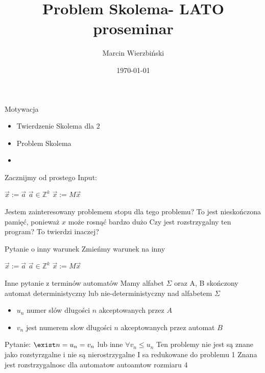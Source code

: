 \documentclass{beamer}
\title{Problem Skolema- LATO proseminar}
\author{Marcin Wierzbiński}
\institute{MIMUW}
\date{\today}
\def\Z{\mathbb Z}
\theoremstyle{definition}
\begin{document}
\frame{\titlepage}

\begin{frame}{Motywacja}
\begin{itemize}
    \item Twierdzenie Skolema dla  $2$
    \item Problem Skolema
    \item 
\end{itemize}
\end{frame}

\begin{frame}{Zacznijmy od prostego}
    Input: 

    \begin{algorithmic}[l]
    \State $\vec{x} := \vec{a}$
    \State $\vec{a} \in \Z^{k}$
      \State $\vec{x} := M \vec{x}$
      
    \EndWhile
    \end{algorithmic}

    Jestem zainteresowany problemem stopu dla tego problemu? To jest nieskończona pamięć, ponieważ $x$ może rosnąć bardzo dużo
    Czy jest rozstrzygalny ten program? To twierdzi inaczej?


\end{frame}

\begin{frame}{Pytanie o inny warunek}
    Zmieńmy warunek na inny 
    \begin{algorithmic}[l]
    \State $\vec{x} := \vec{a}$
    \State $\vec{a} \in \Z^{k}$
      \State $\vec{x} := M \vec{x}$
      
    \EndWhile
    \end{algorithmic}
\end{frame}    

\begin{frame}{Inne pytanie z terminów automatów}
    Mamy alfabet $\Sigma$  oraz A, B skończony automat deterministyczny lub nie-deterministyczny nad alfabetem $\Sigma$
    \begin{itemize}
        \item $u_n$ numer slów długości $n$ akceptowanych przez $A$
        \item  $v_n$ jest numerem slow długości $n$ akceptowanych przez automat $B$

    \end{itemize}
    Pytanie:
    $\exist n = u_n = v_n$
    lub inne 
    $\forall v_n \leq u_n$
    Ten problemy nie jest są znane jako rozstyrzgalne i nie są nierostrzygalne
    I sa redukowane do problemu 1
    Znana jest rozstrzygalnosc dla automatow autoamtow rozmiaru $4$

\end{frame}
\end{document}
